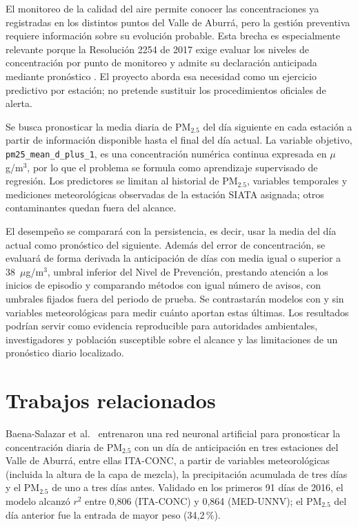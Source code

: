 \documentclass[conference]{IEEEtran}
\begin{document}
El monitoreo de la calidad del aire permite conocer las concentraciones ya
registradas en los distintos puntos del Valle de Aburrá, pero la gestión
preventiva requiere información sobre su evolución probable. Esta brecha es
especialmente relevante porque la Resolución 2254 de 2017 exige evaluar los
niveles de concentración por punto de monitoreo y admite su declaración
anticipada mediante pronóstico \cite{minambiente2017resolucion2254}. El
proyecto aborda esa necesidad como un ejercicio predictivo por estación; no
pretende sustituir los procedimientos oficiales de alerta.

Se busca pronosticar la media diaria de PM$_{2.5}$ del día siguiente en
cada estación a partir de información disponible hasta el final del día
actual. La variable objetivo,
\texttt{pm25\_mean\_d\_plus\_1}, es una concentración numérica continua
expresada en $\mu$g/m$^3$, por lo que el problema se formula como aprendizaje
supervisado de regresión. Los predictores se limitan al historial de
PM$_{2.5}$, variables temporales y mediciones meteorológicas observadas de la
estación SIATA asignada; otros contaminantes quedan fuera del alcance.

El desempeño se comparará con la persistencia, es decir, usar la media del día
actual como pronóstico del siguiente. Además del error de concentración, se
evaluará de forma derivada la anticipación de días con media igual o superior
a 38~$\mu$g/m$^3$, umbral inferior del Nivel de Prevención, prestando atención
a los inicios de episodio y comparando métodos con igual número de avisos,
con umbrales fijados fuera del periodo de prueba. Se contrastarán modelos con
y sin variables meteorológicas para medir cuánto aportan estas últimas. Los
resultados podrían servir como evidencia reproducible para autoridades
ambientales, investigadores y población susceptible sobre el alcance y las
limitaciones de un pronóstico diario localizado.


\section{Trabajos relacionados}
\label{sec:trabajos}

Baena-Salazar et al.\ \cite{baena2019red} entrenaron una red neuronal
artificial para pronosticar la concentración diaria de PM$_{2.5}$ con un día
de anticipación en tres estaciones del Valle de Aburrá, entre ellas ITA-CONC,
a partir de variables meteorológicas (incluida la altura de la capa de
mezcla), la precipitación acumulada de tres días y el PM$_{2.5}$ de uno a
tres días antes. Validado en los primeros 91 días de 2016, el modelo
alcanzó $r^{2}$ entre 0,806 (ITA-CONC) y 0,864 (MED-UNNV); el
PM$_{2.5}$ del día anterior fue la entrada de mayor peso (34,2\,\%).
\end{document}
